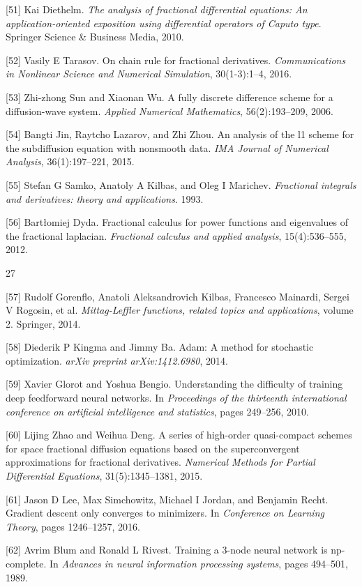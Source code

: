 \documentclass[UTF8]{article}
\begin{document}
[51] Kai Diethelm. \textit{The analysis of fractional differential equations: An application-oriented exposition using differential operators of Caputo type}. Springer Science \& Business Media, 2010.

[52] Vasily E Tarasov. On chain rule for fractional derivatives. \textit{Communications in Nonlinear Science and Numerical Simulation}, 30(1-3):1--4, 2016.

[53] Zhi-zhong Sun and Xiaonan Wu. A fully discrete difference scheme for a diffusion-wave system. \textit{Applied Numerical Mathematics}, 56(2):193--209, 2006.

[54] Bangti Jin, Raytcho Lazarov, and Zhi Zhou. An analysis of the l1 scheme for the subdiffusion equation with nonsmooth data. \textit{IMA Journal of Numerical Analysis}, 36(1):197--221, 2015.

[55] Stefan G Samko, Anatoly A Kilbas, and Oleg I Marichev. \textit{Fractional integrals and derivatives: theory and applications}. 1993.

[56] Bartłomiej Dyda. Fractional calculus for power functions and eigenvalues of the fractional laplacian. \textit{Fractional calculus and applied analysis}, 15(4):536--555, 2012.

\vfill
27

[57] Rudolf Gorenflo, Anatoli Aleksandrovich Kilbas, Francesco Mainardi, Sergei V Rogosin, et al. \textit{Mittag-Leffler functions, related topics and applications}, volume 2. Springer, 2014.

[58] Diederik P Kingma and Jimmy Ba. Adam: A method for stochastic optimization. \textit{arXiv preprint arXiv:1412.6980}, 2014.

[59] Xavier Glorot and Yoshua Bengio. Understanding the difficulty of training deep feedforward neural networks. In \textit{Proceedings of the thirteenth international conference on artificial intelligence and statistics}, pages 249--256, 2010.

[60] Lijing Zhao and Weihua Deng. A series of high-order quasi-compact schemes for space fractional diffusion equations based on the superconvergent approximations for fractional derivatives. \textit{Numerical Methods for Partial Differential Equations}, 31(5):1345--1381, 2015.

[61] Jason D Lee, Max Simchowitz, Michael I Jordan, and Benjamin Recht. Gradient descent only converges to minimizers. In \textit{Conference on Learning Theory}, pages 1246--1257, 2016.

[62] Avrim Blum and Ronald L Rivest. Training a 3-node neural network is np-complete. In \textit{Advances in neural information processing systems}, pages 494--501, 1989.
\end{document}
